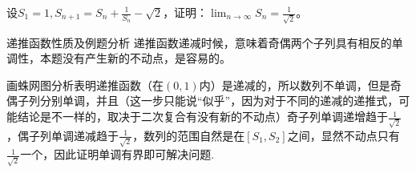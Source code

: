 \documentclass[../../main.tex]{subfiles}%
\begin{document}
\begin{example}
设\(S_1 = 1,S_{n + 1}=S_n+\frac{1}{S_n}-\sqrt{2}\)，证明：\(\lim_{n\rightarrow\infty}S_n=\frac{1}{\sqrt{2}}\)。
\end{example}
\begin{note}
递推函数性质及例题分析
递推函数递减时候，意味着奇偶两个子列具有相反的单调性，本题没有产生新的不动点，是容易的。

画蛛网图分析表明递推函数（在\((0,1)\)内）是递减的，所以数列不单调，但是奇偶子列分别单调，并且（这一步只能说“似乎”，因为对于不同的递减的递推式，可能结论是不一样的，取决于二次复合有没有新的不动点）奇子列单调递增趋于\(\frac{1}{\sqrt{2}}\)，偶子列单调递减趋于\(\frac{1}{\sqrt{2}}\)，数列的范围自然是在\([S_1,S_2]\)之间，显然不动点只有\(\frac{1}{\sqrt{2}}\)一个，因此证明单调有界即可解决问题.
\end{note}
\end{document}
